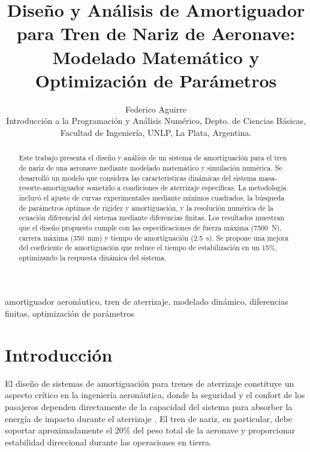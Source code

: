 \documentclass[journal]{IEEEtran}
\begin{document}
\title{Diseño y Análisis de Amortiguador para Tren de Nariz de Aeronave: Modelado Matemático y Optimización de Parámetros
}
\author{Federico Aguirre \\
Introducción a la Programación y Análisis Numérico, Depto. de Ciencias Básicas, Facultad de Ingeniería, UNLP, La Plata, Argentina.}
\maketitle

\begin{abstract}
Este trabajo presenta el diseño y análisis de un sistema de amortiguación para el tren de nariz de una aeronave mediante modelado matemático y simulación numérica. Se desarrolló un modelo que considera las características dinámicas del sistema masa-resorte-amortiguador sometido a condiciones de aterrizaje específicas. La metodología incluyó el ajuste de curvas experimentales mediante mínimos cuadrados, la búsqueda de parámetros óptimos de rigidez y amortiguación, y la resolución numérica de la ecuación diferencial del sistema mediante diferencias finitas. Los resultados muestran que el diseño propuesto cumple con las especificaciones de fuerza máxima (\SI{7500}{\newton}), carrera máxima (\SI{350}{\milli\meter}) y tiempo de amortiguación (\SI{2.5}{\second}). Se propone una mejora del coeficiente de amortiguación que reduce el tiempo de estabilización en un 15\%, optimizando la respuesta dinámica del sistema.
\end{abstract}

\begin{IEEEkeywords}
amortiguador aeronáutico, tren de aterrizaje, modelado dinámico, diferencias finitas, optimización de parámetros
\end{IEEEkeywords}

\section{Introducción}

El diseño de sistemas de amortiguación para trenes de aterrizaje constituye un aspecto crítico en la ingeniería aeronáutica, donde la seguridad y el confort de los pasajeros dependen directamente de la capacidad del sistema para absorber la energía de impacto durante el aterrizaje \cite{currey2006aircraft}. El tren de nariz, en particular, debe soportar aproximadamente el 20\% del peso total de la aeronave y proporcionar estabilidad direccional durante las operaciones en tierra.
\end{document}
